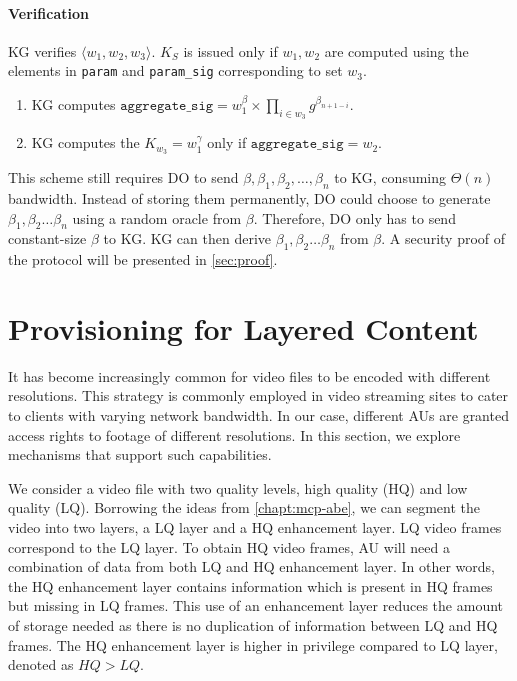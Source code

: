 \documentclass[hyp,a4paper,12pt,openbib]{socreport}
\begin{document}
\paragraph{Verification} KG verifies $\langle w_1, w_2, w_3 \rangle$. $K_S$ is issued only if $w_1,w_2$ are computed using the elements in \texttt{param} and \texttt{param\_sig} corresponding to set $w_3$.
\begin{enumerate}
\item KG computes $\texttt{aggregate\_sig} = \displaystyle w_1^{\beta} \times \prod_{i \in w_3}  g^{\beta_{n+1-i}}$.
\item KG computes the $K_{w_3} = w_1^\gamma$ only if $\texttt{aggregate\_sig} =  w_2$.
\end{enumerate}

This scheme still requires DO to send $\beta, \beta_1, \beta_2, \dots, \beta_n$ to KG, consuming $\Theta(n)$ bandwidth. Instead of storing them permanently, DO could choose to generate $\beta_1, \beta_2 \dots \beta_n$ using a random oracle from $\beta$. Therefore, DO only has to send constant-size $\beta$ to KG. KG can then derive $\beta_1, \beta_2 \dots \beta_n$ from $\beta$. A security proof of the protocol will be presented in \cref{sec:proof}.



\section{Provisioning for Layered Content}
\label{sec:layered}


It has become increasingly common for video files to be encoded with different resolutions. This strategy is commonly employed in video streaming sites to cater to clients with varying network bandwidth. In our case, different AUs are granted access rights to footage of different resolutions.  In this section, we explore mechanisms that support such capabilities.

We consider a video file with two quality levels, high quality (HQ) and low quality (LQ). Borrowing the ideas from \cref{chapt:mcp-abe}, we can segment the video into two layers, a LQ layer and a HQ enhancement layer. LQ video frames correspond to the LQ layer. To obtain HQ video frames, AU will need a combination of data from both LQ and HQ enhancement layer. In other words, the HQ enhancement layer contains information which is present in HQ frames but missing in LQ frames. This use of an enhancement layer reduces the amount of storage needed as there is no duplication of information between LQ and HQ frames. The HQ enhancement layer is higher in privilege compared to LQ layer, denoted as $HQ>LQ$.
\end{document}
